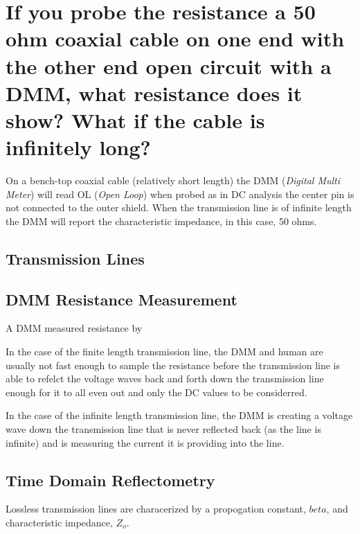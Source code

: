 \documentclass[main.tex]{subfiles}
\begin{document}
\section{If you probe the resistance a 50 ohm coaxial cable on one end with the other end open circuit with a DMM, what resistance does it show? What if the cable is infinitely long?}

\spoilerline


\noindent On a bench-top coaxial cable (relatively short length) the DMM (\textit{Digital Multi Meter}) will read OL (\textit{Open Loop}) when probed as in DC analysis the center pin is not connected to the outer shield. When the transmission line is of infinite length the DMM will report the characteristic impedance, in this case, 50 ohms.

\subsection{Transmission Lines}


\subsection{DMM Resistance Measurement}
A DMM measured resistance by 

In the case of the finite length transmission line, the DMM and human are usually not fast enough to sample the resistance before the transmission line is able to refelct the voltage waves back and forth down the transmission line enough for it to all even out and only the DC values to be considerred.

In the case of the infinite length transmission line, the DMM is creating a voltage wave down the transmission line that is never reflected back (as the line is infinite) and is measuring the current it is providing into the line. 

\subsection{Time Domain Reflectometry}
Lossless transmission lines are characerized by a propogation constant, $beta$, and characteristic impedance, $Z_o$. 
\end{document}
